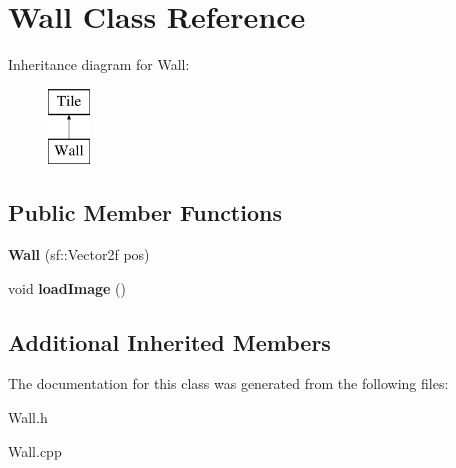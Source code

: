 \hypertarget{class_wall}{}\section{Wall Class Reference}
\label{class_wall}
Inheritance diagram for Wall\+:\begin{figure}[H]
\begin{center}
\leavevmode
\includegraphics[height=2.000000cm]{class_wall}
\end{center}
\end{figure}
\subsection*{Public Member Functions}
\begin{DoxyCompactItemize}
\item 
\mbox{\label{class_wall_aef304af86fdbcbee161df1d36db8bfd4}} 
{\bfseries Wall} (sf\+::\+Vector2f pos)
\item 
\mbox{\label{class_wall_a939a04ba33d30643467703820803e843}} 
void {\bfseries load\+Image} ()
\end{DoxyCompactItemize}
\subsection*{Additional Inherited Members}


The documentation for this class was generated from the following files\+:\begin{DoxyCompactItemize}
\item 
Wall.\+h\item 
Wall.\+cpp\end{DoxyCompactItemize}
